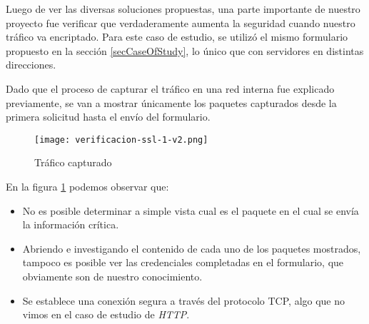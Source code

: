 Luego de ver las diversas soluciones propuestas, una parte importante de 
nuestro proyecto fue verificar que verdaderamente aumenta la seguridad
cuando nuestro tráfico va encriptado. Para este caso de estudio, se utilizó
el mismo formulario propuesto en la sección \ref{secCaseOfStudy}, lo 
único que con servidores en distintas direcciones.

Dado que el proceso de capturar el tráfico en una red interna fue
explicado previamente, se van a mostrar únicamente los paquetes capturados
desde la primera solicitud hasta el envío del formulario.

\begin{center}
   \begin{figure}   
      \begin{center}
         \texttt{[image: verificacion-ssl-1-v2.png]}
      \end{center}
      \caption{Tráfico capturado}
      \label{traficoCap}
   \end{figure}
\end{center}

En la figura \ref{traficoCap} podemos observar que:
\begin{itemize}
   \setlength\itemsep{-0.6em}
   \item No es posible determinar a simple vista cual es el paquete 
   en el cual se envía la información crítica.
   \item Abriendo e investigando el contenido de cada uno de los paquetes mostrados,
   tampoco es posible ver las credenciales completadas en el formulario, 
   que obviamente son de nuestro conocimiento.
   \item Se establece una conexión segura a través del protocolo TCP, algo que no 
   vimos en el caso de estudio de \emph{HTTP}.
\end{itemize}


